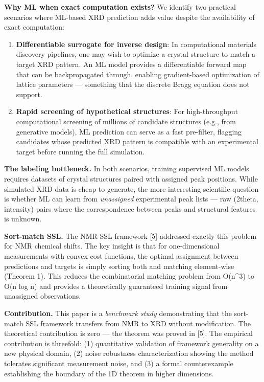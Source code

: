 \documentclass[
  11pt,
]{article}
\begin{document}
\textbf{Why ML when exact computation exists?} We identify two practical
scenarios where ML-based XRD prediction adds value despite the
availability of exact computation:

\begin{enumerate}
\def\labelenumi{\arabic{enumi}.}
\item
  \textbf{Differentiable surrogate for inverse design}: In computational
  materials discovery pipelines, one may wish to optimize a crystal
  structure to match a target XRD pattern. An ML model provides a
  differentiable forward map that can be backpropagated through,
  enabling gradient-based optimization of lattice parameters ---
  something that the discrete Bragg equation does not support.
\item
  \textbf{Rapid screening of hypothetical structures}: For
  high-throughput computational screening of millions of candidate
  structures (e.g., from generative models), ML prediction can serve as
  a fast pre-filter, flagging candidates whose predicted XRD pattern is
  compatible with an experimental target before running the full
  simulation.
\end{enumerate}

\textbf{The labeling bottleneck.} In both scenarios, training supervised
ML models requires datasets of crystal structures paired with assigned
peak positions. While simulated XRD data is cheap to generate, the more
interesting scientific question is whether ML can learn from
\emph{unassigned} experimental peak lists --- raw (2theta, intensity)
pairs where the correspondence between peaks and structural features is
unknown.

\textbf{Sort-match SSL.} The NMR-SSL framework {[}5{]} addressed exactly
this problem for NMR chemical shifts. The key insight is that for
one-dimensional measurements with convex cost functions, the optimal
assignment between predictions and targets is simply sorting both and
matching element-wise (Theorem 1). This reduces the combinatorial
matching problem from O(n\^{}3) to O(n log n) and provides a
theoretically guaranteed training signal from unassigned observations.

\textbf{Contribution.} This paper is a \emph{benchmark study}
demonstrating that the sort-match SSL framework transfers from NMR to
XRD without modification. The theoretical contribution is zero --- the
theorem was proved in {[}5{]}. The empirical contribution is threefold:
(1) quantitative validation of framework generality on a new physical
domain, (2) noise robustness characterization showing the method
tolerates significant measurement noise, and (3) a formal counterexample
establishing the boundary of the 1D theorem in higher dimensions.
\end{document}

